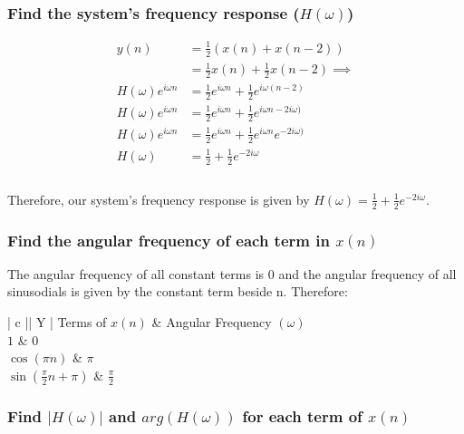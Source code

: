 \documentclass{article}
\newenvironment{directsubsubs}{
  \makeatletter
  \renewcommand\thesubsubsection{\thesection.\Roman{subsubsection}}
  \makeatother
}{
  \makeatletter
  \renewcommand\thesubsubsection{\thesubsection.\Roman{subsubsection}}
  \makeatother
}
\renewcommand{\thesubsection}{\thesection.\alph{subsection}}
\renewcommand{\thesubsubsection}{\thesection.\alph{subsection}.\Roman{subsubsection}}
\begin{document}
\begin{directsubsubs}
\subsubsection[~\thesubsubsection]{Find the system's frequency response ($H(\omega)$)}

\begin{align*}
	y(n) &= \frac{1}{2}(x(n) + x(n - 2)) \\
	&= \frac{1}{2}x(n) + \frac{1}{2}x(n - 2) \implies \\
	H(\omega)e^{i{\omega}n} &= \frac{1}{2}e^{i{\omega}n} + \frac{1}{2}e^{i{\omega}(n - 2)} \\
	H(\omega)e^{i{\omega}n} &= \frac{1}{2}e^{i{\omega}n} + \frac{1}{2}e^{i{\omega}n - 2i{\omega})} \\
	H(\omega)e^{i{\omega}n} &= \frac{1}{2}e^{i{\omega}n} + \frac{1}{2}e^{i{\omega}n}e^{-2i{\omega})} \\
	H(\omega) &= \frac{1}{2} + \frac{1}{2}e^{-2i{\omega}} \\\\
\end{align*}

Therefore, our system's frequency response is given by $H(\omega) = \frac{1}{2} + \frac{1}{2}e^{-2i{\omega}}$.

\subsubsection[~\thesubsubsection]{Find the angular frequency of each term in $x(n)$}


The angular frequency of all constant terms is 0 and the angular frequency of all sinusodials is given by the constant term beside n. Therefore:

\begin{tabularx}{\linewidth}{| c || Y |}
	\hline
	Terms of $x(n)$ & Angular Frequency $(\omega)$ \\
	\hline
	$1$ & $0$ \\
	$\cos{({\pi}n)}$ & $\pi$ \\
	$\sin{(\tfrac{\pi}{2}n + \pi)}$ & $\tfrac{\pi}{2}$ \\
	\hline
\end{tabularx}

\subsubsection[~\thesubsubsection]{Find $|H(\omega)|$ and $arg(H(\omega))$ for each term of $x(n)$}


\end{directsubsubs}
\end{document}
